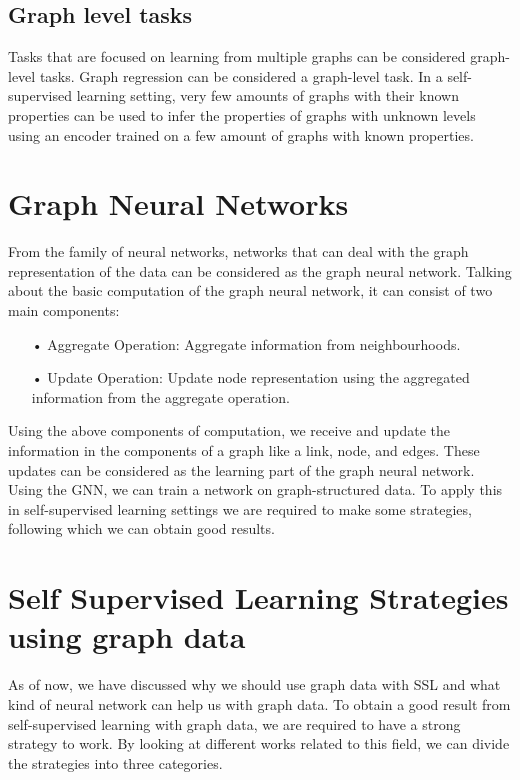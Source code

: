 \documentclass[a4paper,11pt]{report}
\begin{document}
\section{Graph level tasks}
Tasks that are focused on learning from multiple graphs can be considered graph-level tasks. Graph regression can be considered a graph-level task. In a self-supervised learning setting, very few amounts of graphs with their known properties can be used to infer the properties of graphs with unknown levels using an encoder trained on a few amount of graphs with known properties.

\chapter{Graph Neural Networks}

From the family of neural networks, networks that can deal with the graph representation of the data can be considered as the graph neural network. Talking about the basic computation of the graph neural network, it can consist of two main components:

\begin{itemize}
\item[•] Aggregate Operation: Aggregate information from neighbourhoods.

\item[•] Update Operation: Update node representation using the aggregated information from the aggregate operation.
\end{itemize}

Using the above components of computation, we receive and update the information in the components of a graph like a link, node, and edges. These updates can be considered as the learning part of the graph neural network. Using the GNN, we can train a network on graph-structured data. To apply this in self-supervised learning settings we are required to make some strategies, following which we can obtain good results. 

\chapter{Self Supervised Learning Strategies using graph data}

As of now, we have discussed why we should use graph data with SSL and what kind of neural network can help us with graph data. To obtain a good result from self-supervised learning with graph data, we are required to have a strong strategy to work. By looking at different works related to this field, we can divide the strategies into three categories.  
\end{document}
